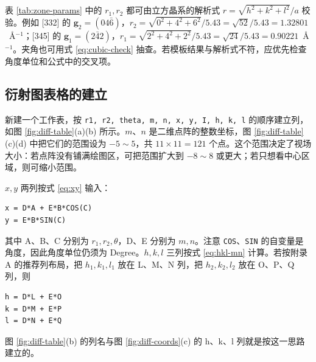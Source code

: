 表 \ref{tab:zone-params} 中的 $r_1,r_2$ 都可由立方晶系的解析式 $r=\sqrt{h^2+k^2+l^2}/a$ 校验。例如 [332] 的 $\bm{g}_2=(04\bar{6})$，$r_2=\sqrt{0^2+4^2+6^2}/5.43=\sqrt{52}/5.43=1.32801$~\AA$^{-1}$；[345] 的 $\bm{g}_1=(2\bar{4}2)$，$r_1=\sqrt{2^2+4^2+2^2}/5.43=\sqrt{24}/5.43=0.90221$~\AA$^{-1}$。夹角也可用式 \eqref{eq:cubic-check} 抽查。若模板结果与解析式不符，应优先检查角度单位和公式中的交叉项。


\subsection{衍射图表格的建立}

新建一个工作表，按 \texttt{r1, r2, theta, m, n, x, y, I, h, k, l} 的顺序建立列，如图 \ref{fig:diff-table}(a)(b) 所示。$m$、$n$ 是二维点阵的整数坐标，图 \ref{fig:diff-table}(c)(d) 中把它们的范围设为 $-5\sim5$，共 $11\times11=121$ 个点。这个范围决定了视场大小：若点阵没有铺满绘图区，可把范围扩大到 $-8\sim8$ 或更大；若只想看中心区域，则可缩小范围。

$x,y$ 两列按式 \eqref{eq:xy} 输入：
\begin{lstlisting}
x = D*A + E*B*COS(C)
y = E*B*SIN(C)
\end{lstlisting}
其中 A、B、C 分别为 $r_1,r_2,\theta$，D、E 分别为 $m,n$。注意 \texttt{COS}、\texttt{SIN} 的自变量是角度，因此角度单位仍须为 Degree。$h,k,l$ 三列按式 \eqref{eq:hkl-mn} 计算。若按附录 A 的推荐列布局，把 $h_1,k_1,l_1$ 放在 L、M、N 列，把 $h_2,k_2,l_2$ 放在 O、P、Q 列，则
\begin{lstlisting}
h = D*L + E*O
k = D*M + E*P
l = D*N + E*Q
\end{lstlisting}
图 \ref{fig:diff-table}(b) 的列名与图 \ref{fig:diff-coords}(c) 的 h、k、l 列就是按这一思路建立的。

